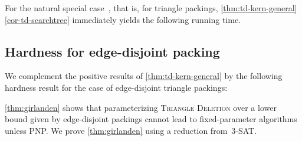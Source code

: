 \documentclass[envcountsame,numbook,smallextended]{svjour3}
\numberwithin{equation}{section}
\numberwithin{figure}{section}
\newcommand{\TAGP}{\textsc{Triangle Deletion with  Cost- Packing}}
\newcommand{\TATP}{\textsc{Triangle Deletion with  Triangle Packing}}
\newcommand{\POITS}{\textsc{3-SAT}}
\begin{document}
For the natural special case~, that is, for triangle packings, \cref{thm:td-kern-general}\eqref{cor-td-searchtree} immediately yields the following running time.

















\subsection{Hardness for edge-disjoint packing}\label{sec:trdneg}
\noindent We complement the positive results of \cref{thm:td-kern-general} by the following hardness result for the case of edge-disjoint triangle packings:

\noindent \cref{thm:girlanden} shows that parameterizing \textsc{Triangle Deletion} over a lower bound given by edge-disjoint packings cannot lead to fixed-parameter algorithms unless PNP.  We prove \cref{thm:girlanden} using a reduction from~\POITS{}.
\end{document}
